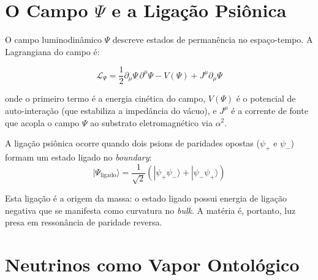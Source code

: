 \documentclass[12pt,a4paper,twoside]{article}
\newcommand{\alphaii}{\alpha^{2}}
\newcommand{\Psifield}{\Psi}
\newcommand{\psion}{\psi}
\newcommand{\boundary}{\textit{boundary}}
\newcommand{\bulk}{\textit{bulk}}
\begin{document}

\section{O Campo $\Psifield$ e a Liga\c{c}\~ao Psi\^onica}


O campo luminodin\^amico $\Psifield$ descreve estados de perman\^encia no espa\c{c}o-tempo. A Lagrangiana do campo \'e:

\begin{equationbox}[title={Lagrangiana do Campo $\Psifield$}]
\begin{equation}
\mathcal{L}_\Psifield = \frac{1}{2}\partial_\mu \Psifield \,\partial^\mu \Psifield - V(\Psifield) + J^\mu \partial_\mu \Psifield
\label{eq:lagpsi}
\end{equation}
\end{equationbox}

\noindent onde o primeiro termo \'e a energia cin\'etica do campo, $V(\Psifield)$ \'e o potencial de auto-intera\c{c}\~ao (que estabiliza a imped\^ancia do v\'acuo), e $J^\mu$ \'e a corrente de fonte que acopla o campo $\Psifield$ ao substrato eletromagn\'etico via $\alphaii$.

A liga\c{c}\~ao psi\^onica ocorre quando dois psions de paridades opostas ($\psion_+$ e $\psion_-$) formam um estado ligado no \boundary:
\begin{equation}
|\Psifield_{\text{ligado}}\rangle = \frac{1}{\sqrt{2}}\left(|\psion_+\psion_-\rangle + |\psion_-\psion_+\rangle\right)
\label{eq:ligacao}
\end{equation}

Esta liga\c{c}\~ao \'e a origem da massa: o estado ligado possui energia de liga\c{c}\~ao negativa que se manifesta como curvatura no \bulk. A mat\'eria \'e, portanto, luz presa em resson\^ancia de paridade reversa.


\section{Neutrinos como Vapor Ontol\'ogico}
\end{document}
